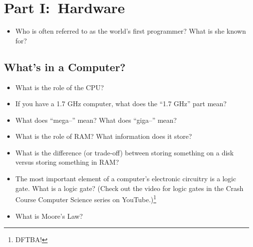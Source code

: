 \documentclass[12pt]{article}
\begin{document}
\hrulefill

\section*{Part I:\ Hardware}
\begin{itemize}
	\item Who is often referred to as the world's first programmer? What is she known for?
\end{itemize}

\subsection*{What's in a Computer?}
\begin{itemize}
	\item What is the role of the CPU?
	\item If you have a 1.7 GHz computer, what does the ``1.7 GHz'' part mean?
	\item What does ``mega--'' mean? What does ``giga--'' mean?
	\item What is the role of RAM? What information does it store?
	\item What is the difference (or trade-off) between storing something on a disk versus storing something in RAM?
	\item The most important element of a computer's electronic circuitry is a logic gate. What is a logic gate? (Check out the video for logic gates in the Crash Course Computer Science series on YouTube.)\footnote{DFTBA!}
	\item What is Moore's Law?
\end{itemize}
\end{document}
